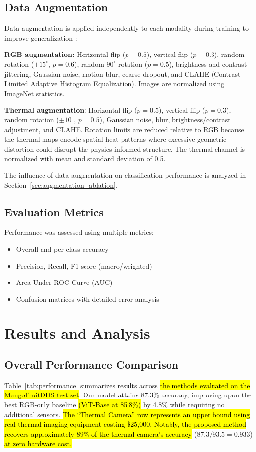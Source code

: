 \documentclass[utf8]{FrontiersinHarvard}
\newenvironment{revblock}{}{}
\begin{document}
\begin{revblock}
\subsection{Data Augmentation}
Data augmentation is applied independently to each modality during training to improve generalization \cite{shorten2019}:

\textbf{RGB augmentation:} Horizontal flip ($p{=}0.5$), vertical flip ($p{=}0.3$), random rotation ($\pm 15^{\circ}$, $p{=}0.6$), random $90^{\circ}$ rotation ($p{=}0.5$), brightness and contrast jittering, Gaussian noise, motion blur, coarse dropout, and CLAHE (Contrast Limited Adaptive Histogram Equalization). Images are normalized using ImageNet statistics.

\textbf{Thermal augmentation:} Horizontal flip ($p{=}0.5$), vertical flip ($p{=}0.3$), random rotation ($\pm 10^{\circ}$, $p{=}0.5$), Gaussian noise, blur, brightness/contrast adjustment, and CLAHE. Rotation limits are reduced relative to RGB because the thermal maps encode spatial heat patterns where excessive geometric distortion could disrupt the physics-informed structure. The thermal channel is normalized with mean and standard deviation of 0.5.

The influence of data augmentation on classification performance is analyzed in Section~\ref{sec:augmentation_ablation}.
\end{revblock}

\subsection{Evaluation Metrics}
Performance was assessed using multiple metrics:
\begin{itemize}
    \item Overall and per-class accuracy
    \item Precision, Recall, F1-score (macro/weighted)
    \item Area Under ROC Curve (AUC)
    \item Confusion matrices with detailed error analysis
\end{itemize}

\section{Results and Analysis}

\subsection{Overall Performance Comparison}
Table~\ref{tab:performance} summarizes results across \hl{the methods evaluated on the MangoFruitDDS test set}. Our model attains 87.3\% accuracy, improving upon the best RGB-only baseline \hl{(ViT-Base at 85.8\%)} by 4.8\% while requiring no additional sensors. \hl{The ``Thermal Camera'' row represents an upper bound using real thermal imaging equipment costing \$25,000. Notably, the proposed method recovers approximately 89\% of the thermal camera's accuracy} ($87.3/93.5 = 0.933$) \hl{at zero hardware cost.}
\end{document}
